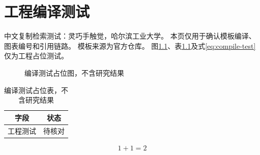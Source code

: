 \documentclass[fontset=fandol,type=master,campus=harbin]{hithesisbook}
\begin{document}
\frontmatter
\tableofcontents
\listoffigures
\listoftables
\mainmatter
\chapter{工程编译测试}
中文复制检索测试：灵巧手触觉，哈尔滨工业大学。
本页仅用于确认模板编译、图表编号和引用链路。
模板来源为官方仓库\cite{hithesis-template}。
图\ref{fig:compile-test}、表\ref{tab:compile-test}及式\eqref{eq:compile-test}仅为工程占位测试。
\begin{figure}[htbp]
\centering
\fbox{\rule{0pt}{15mm}\rule{45mm}{0pt}}
\caption{编译测试占位图，不含研究结果}
\label{fig:compile-test}
\end{figure}
\begin{table}[htbp]
\centering
\caption{编译测试占位表，不含研究结果}
\label{tab:compile-test}
\begin{tabular}{cc}
\toprule
字段 & 状态 \\
\midrule
工程测试 & 待核对 \\
\bottomrule
\end{tabular}
\end{table}
\begin{equation}\label{eq:compile-test}1+1=2\end{equation}
\backmatter


\end{document}
